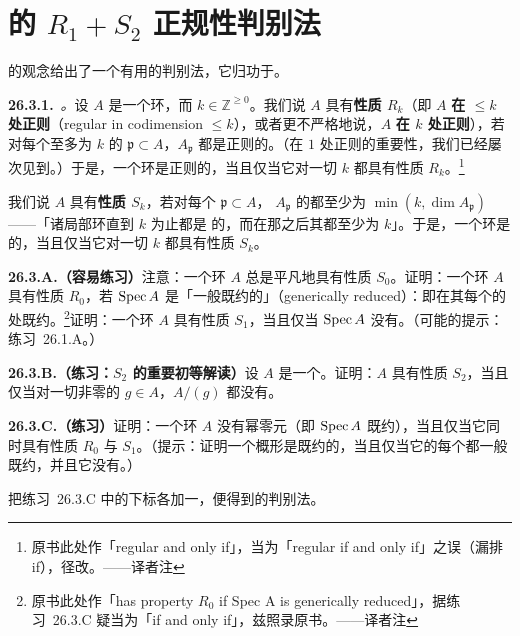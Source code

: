 
\section{\trSerre{}的 $R_1+S_2$ 正规性判别法}

\trDepth{}的观念给出了一个有用的\trNormality{}判别法，它归功于\trSerre{}。

\textbf{26.3.1.}\ \emph{\trhDefinition{}。}\quad 设 $A$ 是一个\trNoether{}环，而 $k\in\mathbb{Z}^{\ge0}$。我们说 $A$ 具有\textbf{性质 $R_k$}（即 $A$ \textbf{在\trCodimension{} $\le k$ 处正则}（regular in codimension $\le k$），或者更不严格地说，$A$ \textbf{在\trCodimension{} $k$ 处正则}），若对每个\trCodimension{}至多为 $k$ 的\trPrimeIdeal{} $\mathfrak{p}\subset A$，$A_{\mathfrak{p}}$ 都是正则的。（在\trCodimension{} $1$ 处正则的重要性，我们已经屡次见到。）于是，一个\trNoether{}环是正则的，当且仅当它对一切 $k$ 都具有性质 $R_k$。\footnote{原书此处作「regular and only if」，当为「regular if and only if」之误（漏排 if），径改。——译者注}

我们说 $A$ 具有\textbf{性质 $S_k$}，若对每个\trPrimeIdeal{} $\mathfrak{p}\subset A$，\trLocalRing{} $A_{\mathfrak{p}}$ 的\trDepth{}都至少为 $\min(k,\dim A_{\mathfrak{p}})$——「诸局部环直到\trCodimension{} $k$ 为止都是 \trCM{}的，而在那之后其\trDepth{}都至少为 $k$」。于是，一个\trNoether{}环是 \trCM{}的，当且仅当它对一切 $k$ 都具有性质 $S_k$。

\textbf{26.3.A.（容易练习）}\quad 注意：一个\trNoether{}环 $A$ 总是平凡地具有性质 $S_0$。证明：一个\trNoether{}环 $A$ 具有性质 $R_0$，若 $\operatorname{Spec} A$ 是「一般既约的」（generically reduced）：即在其每个\trIrreducibleComponent{}的\trGenericPoint{}处既约。\footnote{原书此处作「has property \(R_0\) if Spec A is generically reduced」，据\mbox{练习~26.3.C} 疑当为「if and only if」，兹照录原书。——译者注}证明：一个\trNoether{}环 $A$ 具有性质 $S_1$，当且仅当 $\operatorname{Spec} A$ 没有\trEmbeddedPoint{}。（可能的提示：\mbox{练习~26.1.A}。）

\textbf{26.3.B.（练习：$S_2$ 的重要初等解读）}\quad 设 $A$ 是一个\trNoether{}\trIntegralDomain。证明：$A$ 具有性质 $S_2$，当且仅当对一切非零的 $g\in A$，$A/(g)$ 都没有\trEmbeddedPrime{}。

\textbf{26.3.C.（练习）}\quad 证明：一个\trNoether{}环 $A$ 没有幂零元（即 $\operatorname{Spec} A$ 既约），当且仅当它同时具有性质 $R_0$ 与 $S_1$。（提示：证明一个\trNoether{}概形是既约的，当且仅当它的每个\trIrreducibleComponent{}都一般既约，并且它没有\trEmbeddedPoint{}。）

把\mbox{练习~26.3.C} 中的下标各加一，便得到\trSerre{}的判别法。

